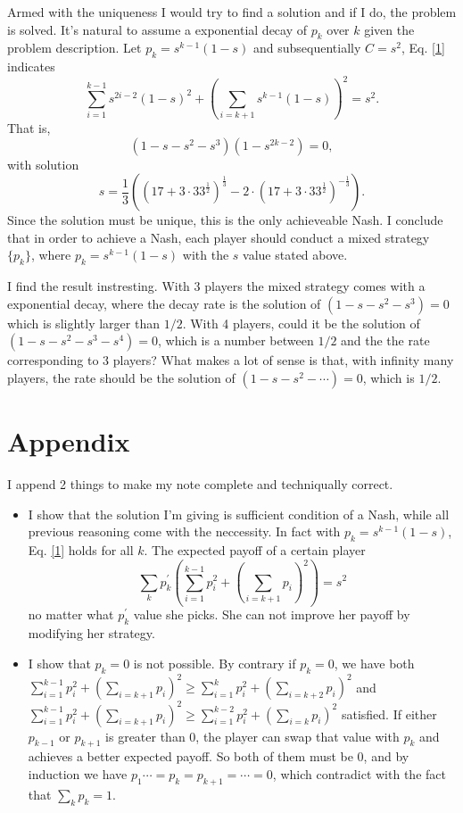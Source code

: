 \documentclass[a4paper]{article}
\begin{document}
Armed with the uniqueness I would try to find a solution and if I do, the problem is solved. It's natural to assume a exponential decay of $p_k$ over $k$ given the problem description. Let $p_k=s^{k-1}(1-s)$ and subsequentially $C=s^2$, Eq. \eqref{1} indicates 
$$\sum_{i=1}^{k-1}s^{2i-2}(1-s)^2+(\sum_{i=k+1}s^{k-1}(1-s))^2=s^2 \label{3}.$$
That is, 
$$(1-s-s^2-s^3)(1-s^{2k-2})=0,$$
with solution
$$s=\frac{1}{3}((17+3\cdot33^{\frac{1}{2}})^\frac{1}{3}-2\cdot(17+3\cdot33^{\frac{1}{2}})^{-\frac{1}{3}}).$$
Since the solution must be unique, this is the only achieveable Nash. I conclude that in order to achieve a Nash, each player should conduct a mixed strategy $\{p_k\}$, where $p_k=s^{k-1}(1-s)$ with the $s$ value stated above.

I find the result instresting. With 3 players the mixed strategy comes with a exponential decay, where the decay rate is the solution of $(1-s-s^2-s^3)=0$ which is slightly larger than $1/2$. With 4 players, could it be the solution of $(1-s-s^2-s^3-s^4)=0$, which is a number between $1/2$ and the the rate corresponding to 3 players? What makes a lot of sense is that, with infinity many players, the rate should be the solution of $(1-s-s^2-\cdots)=0$, which is $1/2$.

\section{Appendix}

I append 2 things to make my note complete and techniqually correct.
\begin{itemize}
  \item I show that the solution I'm giving is sufficient condition of a Nash, while all previous reasoning come with the neccessity. In fact with $p_k=s^{k-1}(1-s)$, Eq. \eqref{1} holds for all $k$. The expected payoff of a certain player
$$\sum_k p_k^\prime(\sum_{i=1}^{k-1}p_i^2+(\sum_{i=k+1}p_i)^2)=s^2$$
no matter what $p_k^\prime$ value she picks. She can not improve her payoff by modifying her strategy.
  \item I show that $p_k=0$ is not possible. By contrary if $p_k=0$, we have both $\sum_{i=1}^{k-1}p_i^2+(\sum_{i=k+1}p_i)^2\geq\sum_{i=1}^{k}p_i^2+(\sum_{i=k+2}p_i)^2$ and $\sum_{i=1}^{k-1}p_i^2+(\sum_{i=k+1}p_i)^2\geq\sum_{i=1}^{k-2}p_i^2+(\sum_{i=k}p_i)^2$ satisfied. If either $p_{k-1}$ or $p_{k+1}$ is greater than 0, the player can swap that value with $p_k$ and achieves a better expected payoff. So both of them must be 0, and by induction we have $p_1\cdots=p_k=p_{k+1}=\cdots=0$, which contradict with the fact that $\sum_k p_k=1$.

\end{itemize}
\end{document}
